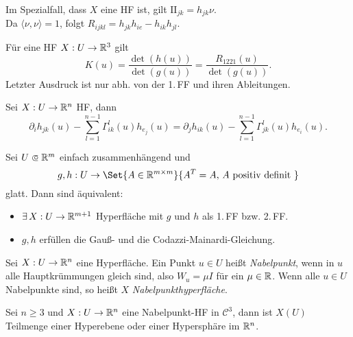 \documentclass{cheat-sheet}
\newcommand{\II}{\mathrm{I\!I}}
\begin{document}
\begin{bem}
  Im Spezialfall, dass $X$ eine HF ist, gilt $\II_{jk} = h_{jk} \nu$.\\
  Da $\langle \nu, \nu \rangle = 1$, folgt $R_{ijkl} = h_{jk} h_{ie} - h_{ik} h_{jl}$.
\end{bem}

\begin{satz}
  Für eine HF $X : U \to \mathbb{R}^3$ gilt
  \[ K(u) = \frac{\det(h(u))}{\det(g(u))} = \frac{R_{1221}(u)}{\det(g(u))}. \]
  Letzter Ausdruck ist nur abh. von der 1.\,FF und ihren Ableitungen.
\end{satz}


\begin{satz}
  Sei $X : U \to \mathbb{R}^n$ HF, dann
  \[ \partial_i h_{jk}(u) - \sum_{l=1}^{n-1} \Gamma_{ik}^l(u) h_{e_j}(u) = \partial_j h_{ik}(u) - \sum_{l=1}^{n-1} \Gamma_{jk}^l(u) h_{e_i}(u). \]
\end{satz}

\begin{satz}
  Sei $U \opn \R^m$ einfach zusammenhängend und
  \[ g, h : U \to \Set{ A \in \R^{m \times m} }{ A^T = A, \, A \text{ positiv definit } } \]
  glatt. Dann sind äquivalent:
  \begin{itemize}
    \item $\exists \, X : U \to \mathbb{R}^{m+1}$ Hyperfläche mit $g$ und $h$ als 1.\,FF bzw. 2.\,FF.
    \item $g, h$ erfüllen die Gauß- und die Codazzi-Mainardi-Gleichung.
  \end{itemize}
\end{satz}



\begin{defn}
  Sei $X : U \to \mathbb{R}^n$ eine Hyperfläche. Ein Punkt $u \in U$ heißt \emph{Nabelpunkt}, wenn in $u$ alle Hauptkrümmungen gleich sind, also $W_u = \mu I$ für ein $\mu \in \mathbb{R}$. Wenn alle $u \in U$ Nabelpunkte sind, so heißt $X$ \emph{Nabelpunkthyperfläche}.
\end{defn}

\begin{satz}
  Sei $n \geq 3$ und $X : U \to \mathbb{R}^n$ eine Nabelpunkt-HF in $\mathcal{C}^3$, dann ist $X(U)$ Teilmenge einer Hyperebene oder einer Hypersphäre im $\mathbb{R}^n$.
\end{satz}
\end{document}
